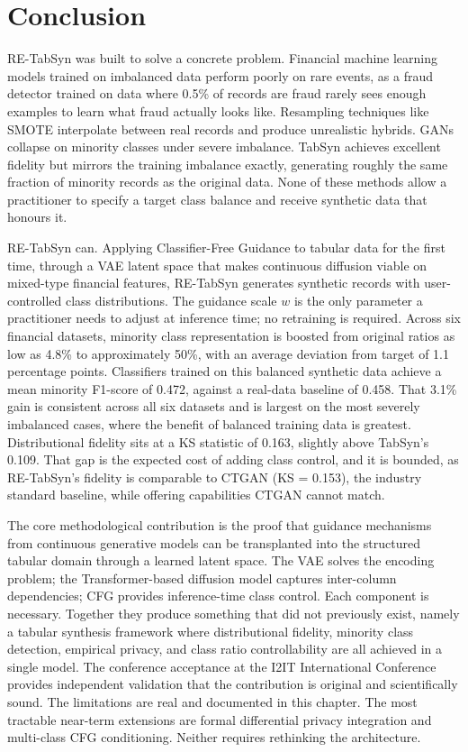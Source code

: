 \chapter{Conclusion}

RE-TabSyn was built to solve a concrete problem. Financial machine learning models trained on imbalanced data perform poorly on rare events, as a fraud detector trained on data where 0.5\% of records are fraud rarely sees enough examples to learn what fraud actually looks like. Resampling techniques like SMOTE interpolate between real records and produce unrealistic hybrids. GANs collapse on minority classes under severe imbalance. TabSyn achieves excellent fidelity but mirrors the training imbalance exactly, generating roughly the same fraction of minority records as the original data. None of these methods allow a practitioner to specify a target class balance and receive synthetic data that honours it.

RE-TabSyn can. Applying Classifier-Free Guidance to tabular data for the first time, through a VAE latent space that makes continuous diffusion viable on mixed-type financial features, RE-TabSyn generates synthetic records with user-controlled class distributions. The guidance scale $w$ is the only parameter a practitioner needs to adjust at inference time; no retraining is required. Across six financial datasets, minority class representation is boosted from original ratios as low as 4.8\% to approximately 50\%, with an average deviation from target of 1.1 percentage points. Classifiers trained on this balanced synthetic data achieve a mean minority F1-score of 0.472, against a real-data baseline of 0.458. That 3.1\% gain is consistent across all six datasets and is largest on the most severely imbalanced cases, where the benefit of balanced training data is greatest. Distributional fidelity sits at a KS statistic of 0.163, slightly above TabSyn's 0.109. That gap is the expected cost of adding class control, and it is bounded, as RE-TabSyn's fidelity is comparable to CTGAN (KS = 0.153), the industry standard baseline, while offering capabilities CTGAN cannot match.

The core methodological contribution is the proof that guidance mechanisms from continuous generative models can be transplanted into the structured tabular domain through a learned latent space. The VAE solves the encoding problem; the Transformer-based diffusion model captures inter-column dependencies; CFG provides inference-time class control. Each component is necessary. Together they produce something that did not previously exist, namely a tabular synthesis framework where distributional fidelity, minority class detection, empirical privacy, and class ratio controllability are all achieved in a single model. The conference acceptance at the I2IT International Conference provides independent validation that the contribution is original and scientifically sound. The limitations are real and documented in this chapter. The most tractable near-term extensions are formal differential privacy integration and multi-class CFG conditioning. Neither requires rethinking the architecture.

